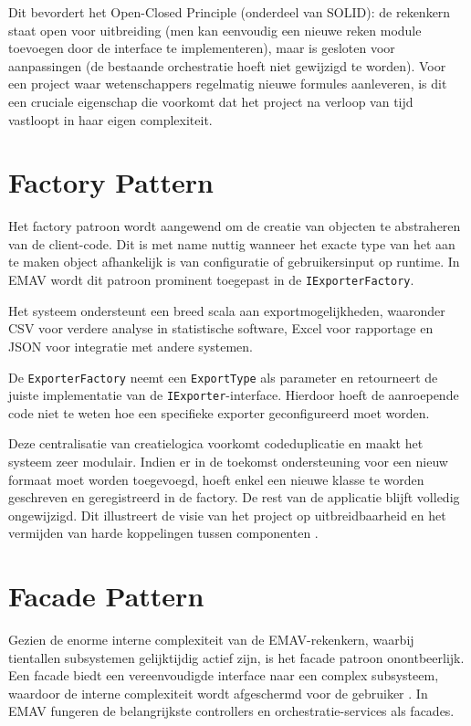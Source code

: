 Dit bevordert het Open-Closed Principle (onderdeel van SOLID): de rekenkern staat open voor uitbreiding (men kan eenvoudig een nieuwe reken module toevoegen door de interface te implementeren), maar is gesloten voor aanpassingen (de bestaande orchestratie hoeft niet gewijzigd te worden). 
Voor een project waar wetenschappers regelmatig nieuwe formules aanleveren, is dit een cruciale eigenschap die voorkomt dat het project na verloop van tijd vastloopt in haar eigen complexiteit.

\section{Factory Pattern}
Het factory patroon wordt aangewend om de creatie van objecten te abstraheren van de client-code. 
Dit is met name nuttig wanneer het exacte type van het aan te maken object afhankelijk is van configuratie of gebruikersinput op runtime. 
In EMAV wordt dit patroon prominent toegepast in de \texttt{IExporterFactory}.

Het systeem ondersteunt een breed scala aan exportmogelijkheden, waaronder CSV voor verdere analyse in statistische software, Excel voor rapportage en JSON voor integratie met andere systemen. {\sloppy De \texttt{ExporterFactory} neemt een \texttt{ExportType} als parameter en retourneert de juiste implementatie van de \texttt{IExporter}-interface. Hierdoor hoeft de aanroepende code niet te weten hoe een specifieke exporter geconfigureerd moet worden.\par}

Deze centralisatie van creatielogica voorkomt codeduplicatie en maakt het systeem zeer modulair. 
Indien er in de toekomst ondersteuning voor een nieuw formaat moet worden toegevoegd, hoeft enkel een nieuwe klasse te worden geschreven en geregistreerd in de factory. 
De rest van de applicatie blijft volledig ongewijzigd. 
Dit illustreert de visie van het project op uitbreidbaarheid en het vermijden van harde koppelingen tussen componenten \autocite{gof1994}.

\section{Facade Pattern}
Gezien de enorme interne complexiteit van de EMAV-rekenkern, waarbij tientallen subsystemen gelijktijdig actief zijn, is het facade patroon onontbeerlijk. 
Een facade biedt een vereenvoudigde interface naar een complex subsysteem, waardoor de interne complexiteit wordt afgeschermd voor de gebruiker \autocite{gof1994}. 
In EMAV fungeren de belangrijkste controllers en orchestratie-services als facades.

